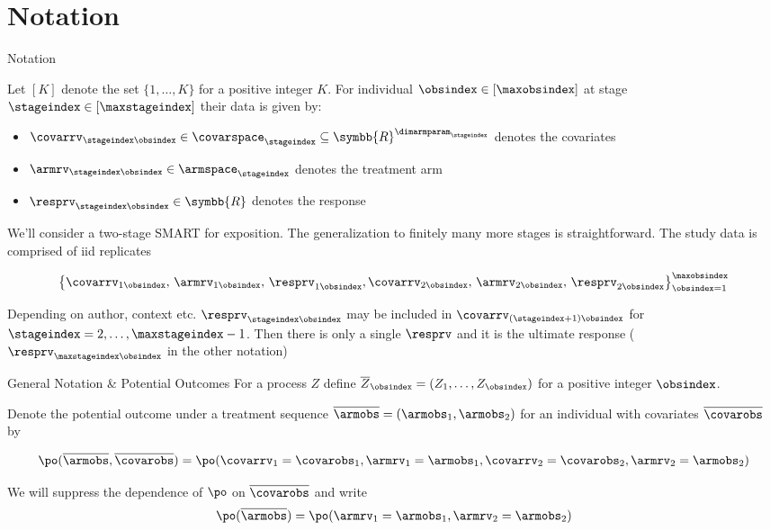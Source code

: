 \documentclass[aspectratio=169, professionalfonts]{beamer}
\begin{document}
\section{Notation}
\begin{frame}[label={sec:org00d2d44}]{Notation}

	Let $[K]$ denote the set $\{1, \ldots, K \}$ for a positive integer $K$. For
	individual $\obsindex \in [\maxobsindex]$ at stage $\stageindex \in
		[\maxstageindex]$ their data is given by:
	\pause
	\begin{itemize}
		\item $\covarrv_{\stageindex \obsindex} \in \covarspace_{\stageindex} \subseteq
			      \symbb{R}^{\dimarmparam_{\stageindex}}$ denotes the covariates

		\item $\armrv_{\stageindex \obsindex} \in \armspace_{\stageindex}$ denotes the treatment arm

		\item $\resprv_{\stageindex \obsindex} \in \symbb{R}$ denotes the response
	\end{itemize}

	\vfill \pause
	We'll consider a two-stage SMART for exposition. The generalization to finitely
	many more stages is straightforward. The study data is comprised of iid replicates

	\vfill
	\pause

	\begin{equation}
		\left\{{\covarrv}_{1\obsindex},\, {\armrv}_{1\obsindex},\,
		{\resprv}_{1\obsindex}, {\covarrv}_{2\obsindex},\, {\armrv}_{2\obsindex},\,
		{\resprv}_{2\obsindex}\right\}_{\obsindex = 1}^{\maxobsindex}
	\end{equation}

	\pause \vfill

	Depending on author, context etc. $\resprv_{\stageindex \obsindex}$ may be
	included in $\covarrv_{(\stageindex + 1) \obsindex}$ for $\stageindex = 2, \ldots,
		\maxstageindex -1$. Then there is only a single $\resprv$ and it is the
	ultimate response ($\resprv_{\maxstageindex \obsindex}$ in the other notation)
\end{frame}


\begin{frame}{General Notation \& Potential Outcomes}
	\vfill
	For a process $Z$ define $\overline{Z}_{\obsindex} = (Z_1, \ldots, Z_{\obsindex})$
	for a positive integer $\obsindex$.

	\pause \vfill

	Denote the potential outcome under a treatment sequence $\overline{\armobs} =
		(\armobs_1, \armobs_2)$ for an individual with covariates $\overline{\covarobs}$  by

	$$\po(\overline{\armobs}, \overline{\covarobs}) = \po(\covarrv_1 = \covarobs_1, \armrv_1 = \armobs_1, \covarrv_2 = \covarobs_2,\armrv_{2} = \armobs_{2})$$

	\pause \vfill


	We will suppress the dependence of $\po$ on $\overline{\covarobs}$ and write
	$$\po(\overline{\armobs}) = \po(\armrv_1 = \armobs_1, \armrv_{2} = \armobs_{2})$$
\end{frame}
\end{document}
